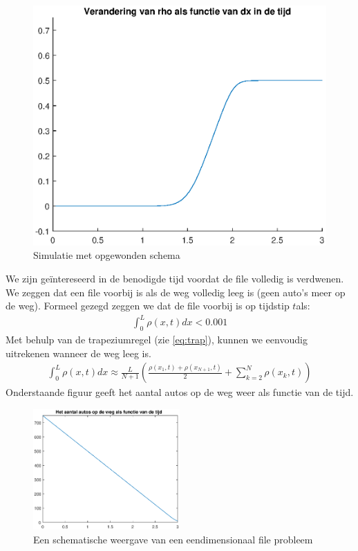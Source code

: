\documentclass{article}
\begin{document}
\begin{figure}[H]
\centering
\includegraphics[scale=0.8]{6goed.eps}
\caption{Simulatie met opgewonden schema}
\end{figure}
We zijn ge\"intereseerd in de benodigde tijd voordat de file volledig is verdwenen.
We zeggen dat een file voorbij is als de weg volledig leeg is (geen auto's meer op de weg). 
Formeel gezegd zeggen we dat de file voorbij is  op tijdstip \(t\)als:
\begin{align*}
	\int_{0}^L\rho(x,t)dx<0.001
\end{align*}
Met behulp van de trapeziumregel (zie \ref{eq:trap}), kunnen we eenvoudig uitrekenen wanneer de weg leeg is.
\begin{align}
	\int_{0}^L\rho(x,t)dx\approx\frac{L}{N+1}\left(\frac{\rho(x_1,t)+\rho(x_{N+1},t)}{2}+\sum_{k=2}^N\rho(x_k,t)\right)\label{eq:trap}
\end{align}
Onderstaande figuur geeft het aantal autos op de weg weer als functie van de tijd.
\begin{figure}[H]
  \centering
  \includegraphics[width=0.5\textwidth]{autos.eps}
  \caption{Een schematische weergave van een eendimensionaal file probleem}
  \label{fig:autos}
\end{figure}
\end{document}
